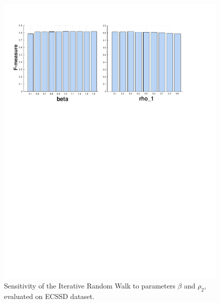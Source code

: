 \documentclass[journal]{IEEEtran}
\begin{document}
\begin{figure}[htbp]
\begin{center}
\includegraphics[width=1\linewidth]{sens2.pdf}
\end{center}
\vspace{-10pt}
\caption{Sensitivity of the Iterative Random Walk to parameters $\beta$ and $\rho_2$, evaluated on ECSSD dataset.}
\label{sens2}
\end{figure}
\end{document}
